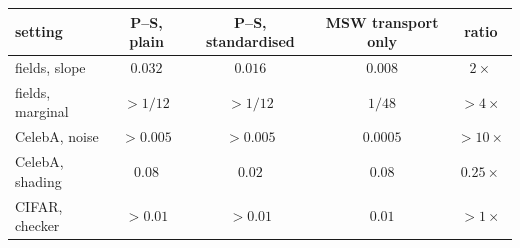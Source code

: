\begin{tabular}{lcccc}
\toprule
setting & P--S, plain & P--S, standardised & MSW transport only & ratio \\
\midrule
fields, slope & $0.032$ & $0.016$ & $0.008$ & $2\times$ \\
fields, marginal & $>1/12$ & $>1/12$ & $1/48$ & $>4\times$ \\
CelebA, noise & $>0.005$ & $>0.005$ & $0.0005$ & $>10\times$ \\
CelebA, shading & $0.08$ & $0.02$ & $0.08$ & $0.25\times$ \\
CIFAR, checker & $>0.01$ & $>0.01$ & $0.01$ & $>1\times$ \\
\bottomrule
\end{tabular}
